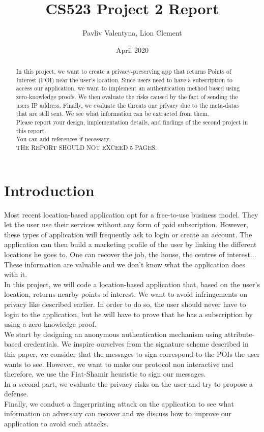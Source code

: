 \documentclass[10pt,conference,compsocconf]{IEEEtran}
\title{CS523 Project 2 Report}
\author{Pavliv Valentyna, Lion Clement}
\date{April 2020}
\begin{document}
\begin{abstract}
	
	In this project, we want to create a privacy-preserving app that returns Points of Interest (POI) near the user's location. Since users need to have a subscription to access our application, we want to implement an authentication method based using zero-knowledge proofs. We then evaluate the risks caused by the fact of sending the users IP address. Finally, we evaluate the threats one privacy due to the meta-datas that are still sent. We see what information can be extracted from them.\\
	
    Please report your design, implementation details, and findings of the second project in this report. \\
    You can add references if necessary. \\
    THE REPORT SHOULD NOT EXCEED 5 PAGES.
\end{abstract}

\section{Introduction}

Most recent location-based application opt for a free-to-use business model. They let the user use their services without any form of paid subscription. However, these types of application will frequently ask to login or create an account. The application can then build a marketing profile of the user by linking the different locations he goes to. One can recover the job, the house, the centres of interest... These information are valuable and we don't know what the application does with it.\\
In this project, we will code a location-based application that, based on the user's location, returns nearby points of interest. We want to avoid infringements on privacy like described earlier. In order to do so, the user should never have to login to the application, but he will have to prove that he has a subscription by using a zero-knowledge proof.\\

We start by designing an anonymous authentication mechanism using attribute-based credentials. We inspire ourselves from the signature scheme described in this paper\cite{SRS}, we consider that the messages to sign correspond to the POIs the user wants to see. However, we want to make our protocol non interactive and therefore, we use the Fiat-Shamir heuristic to sign our messages.\\
In a second part, we evaluate the privacy risks on the user and try to propose a defense.\\
Finally, we conduct a fingerprinting attack on the application to see what information an adversary can recover and we discuss how to improve our application to avoid such attacks.\\
\end{document}
